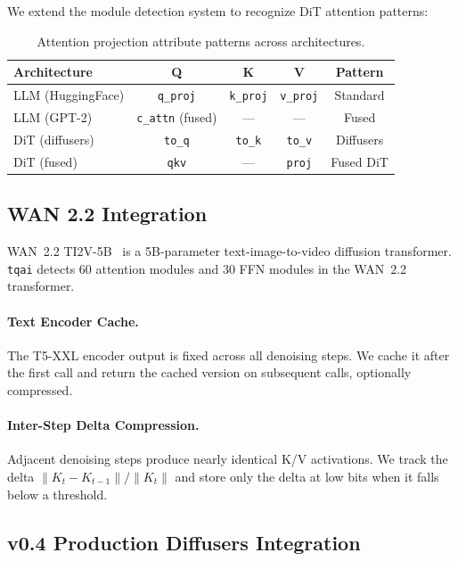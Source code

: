 \documentclass[11pt,a4paper]{article}
\begin{document}
We extend the module detection system to recognize DiT attention patterns:

\begin{table}[h]
\centering
\caption{Attention projection attribute patterns across architectures.}
\label{tab:attn-patterns}
\begin{tabular}{lcccc}
\toprule
\textbf{Architecture} & \textbf{Q} & \textbf{K} & \textbf{V} & \textbf{Pattern} \\
\midrule
LLM (HuggingFace) & \texttt{q\_proj} & \texttt{k\_proj} & \texttt{v\_proj} & Standard \\
LLM (GPT-2)       & \texttt{c\_attn} (fused) & --- & --- & Fused \\
DiT (diffusers)   & \texttt{to\_q} & \texttt{to\_k} & \texttt{to\_v} & Diffusers \\
DiT (fused)       & \texttt{qkv} & --- & \texttt{proj} & Fused DiT \\
\bottomrule
\end{tabular}
\end{table}

\subsection{WAN 2.2 Integration}

WAN~2.2 TI2V-5B~\cite{wan2026} is a 5B-parameter text-image-to-video diffusion transformer. \texttt{tqai} detects 60 attention modules and 30 FFN modules in the WAN~2.2 transformer.

\paragraph{Text Encoder Cache.} The T5-XXL encoder output is fixed across all denoising steps. We cache it after the first call and return the cached version on subsequent calls, optionally compressed.

\paragraph{Inter-Step Delta Compression.} Adjacent denoising steps produce nearly identical K/V activations. We track the delta $\|K_t - K_{t-1}\| / \|K_t\|$ and store only the delta at low bits when it falls below a threshold.

\subsection{v0.4 Production Diffusers Integration}
\end{document}
